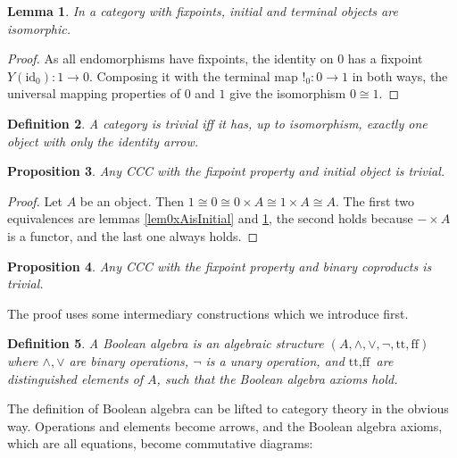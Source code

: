 \documentclass[a4paper]{article}
\newcommand{\arr}{\rightarrow}
\newcommand{\product}{\!\times\!}
\newtheorem{definition}{Definition}[section]
\newtheorem{proposition}[definition]{Proposition}
\newtheorem{lemma}[definition]{Lemma}
\begin{document}
\begin{lemma} \label{lem0isomorphic1}
In a category with fixpoints, initial and terminal objects are isomorphic.
\end{lemma}

\begin{proof}
As all endomorphisms have fixpoints, the identity on $0$ has a fixpoint
$Y(\text{id}_0) : 1 \arr 0$.  Composing it with the terminal map $!_0 : 0 \arr
1$ in both ways, the universal mapping properties of $0$ and $1$ give the
isomorphism $0 \cong 1$.
\end{proof}

\begin{definition}
A category is \emph{trivial} iff it has, up to isomorphism, exactly one object
with only the identity arrow.
\end{definition}

\begin{proposition} \label{propCCCNoFixpointInitialObject}
Any CCC with the fixpoint property and initial object is trivial.
\end{proposition}

\begin{proof}
Let $A$ be an object.  Then $1 \cong 0 \cong 0 \product A \cong 1 \product A
\cong A$. The first two equivalences are lemmas \ref{lem0xAisInitial} and
\ref{lem0isomorphic1}, the second holds because $- \product A$ is a functor, and
the last one always holds.
\end{proof}

\begin{proposition} \label{propCCCNoFixpointCoproducts}
Any CCC with the fixpoint property and binary coproducts is trivial.
\end{proposition}

The proof uses some intermediary constructions which we introduce first.

\newcommand{\true}{\text{tt}}
\newcommand{\false}{\text{ff}}

\begin{definition}
A \emph{Boolean algebra} is an algebraic structure $(A, \wedge, \vee, \neg,
\true, \false)$ where $\wedge, \vee$ are binary operations, $\neg$ is a unary
operation, and $\true, \false$ are distinguished elements of $A$, such that the
Boolean algebra axioms hold.
\end{definition}

The definition of Boolean algebra can be lifted to category theory in the
obvious way. Operations and elements become arrows, and the Boolean algebra
axioms, which are all equations, become commutative diagrams:
\end{document}
